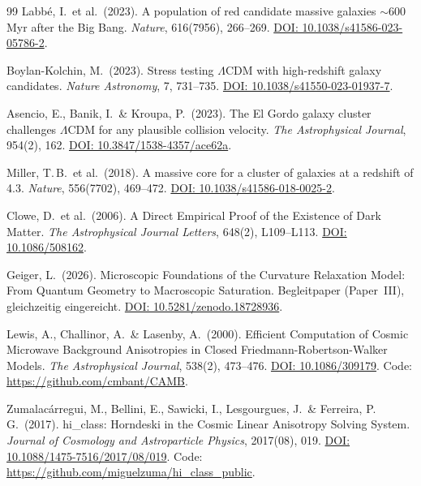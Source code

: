 \documentclass[aps,prd,twocolumn,superscriptaddress,nofootinbib,floatfix]{revtex4-2}
\begin{document}
\begin{thebibliography}{99}
Labb\'e, I.\ et al.\ (2023).
A population of red candidate massive galaxies $\sim$600\,Myr after the Big Bang.
\textit{Nature}, 616(7956), 266--269.
\href{https://doi.org/10.1038/s41586-023-05786-2}{DOI: 10.1038/s41586-023-05786-2}.

Boylan-Kolchin, M.\ (2023).
Stress testing $\Lambda$CDM with high-redshift galaxy candidates.
\textit{Nature Astronomy}, 7, 731--735.
\href{https://doi.org/10.1038/s41550-023-01937-7}{DOI: 10.1038/s41550-023-01937-7}.

Asencio, E., Banik, I.\ \& Kroupa, P.\ (2023).
The El Gordo galaxy cluster challenges $\Lambda$CDM for any plausible collision velocity.
\textit{The Astrophysical Journal}, 954(2), 162.
\href{https://doi.org/10.3847/1538-4357/ace62a}{DOI: 10.3847/1538-4357/ace62a}.

Miller, T.\,B.\ et al.\ (2018).
A massive core for a cluster of galaxies at a redshift of 4.3.
\textit{Nature}, 556(7702), 469--472.
\href{https://doi.org/10.1038/s41586-018-0025-2}{DOI: 10.1038/s41586-018-0025-2}.

Clowe, D.\ et al.\ (2006).
A Direct Empirical Proof of the Existence of Dark Matter.
\textit{The Astrophysical Journal Letters}, 648(2), L109--L113.
\href{https://doi.org/10.1086/508162}{DOI: 10.1086/508162}.

Geiger, L.\ (2026).
Microscopic Foundations of the Curvature Relaxation Model: From Quantum Geometry to Macroscopic Saturation.
Begleitpaper (Paper~III), gleichzeitig eingereicht. \href{https://doi.org/10.5281/zenodo.18728936}{DOI: 10.5281/zenodo.18728936}.

Lewis, A., Challinor, A.\ \& Lasenby, A.\ (2000).
Efficient Computation of Cosmic Microwave Background Anisotropies in Closed Friedmann-Robertson-Walker Models.
\textit{The Astrophysical Journal}, 538(2), 473--476.
\href{https://doi.org/10.1086/309179}{DOI: 10.1086/309179}. Code: \url{https://github.com/cmbant/CAMB}.

Zumalac\'arregui, M., Bellini, E., Sawicki, I., Lesgourgues, J.\ \& Ferreira, P.\,G.\ (2017).
hi\_class: Horndeski in the Cosmic Linear Anisotropy Solving System.
\textit{Journal of Cosmology and Astroparticle Physics}, 2017(08), 019.
\href{https://doi.org/10.1088/1475-7516/2017/08/019}{DOI: 10.1088/1475-7516/2017/08/019}. Code: \url{https://github.com/miguelzuma/hi_class_public}.


\end{thebibliography}
\end{document}
